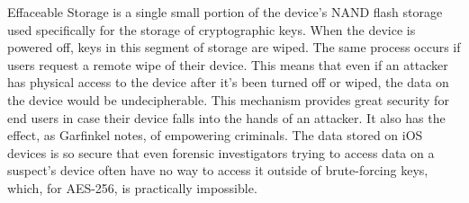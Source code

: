 Effaceable Storage is a single small portion of the device's NAND flash storage
used specifically for the storage of cryptographic keys. When the device is
powered off, keys in this segment of storage are wiped. The same process occurs
if users request a remote wipe of their device. This means that even if
an attacker has physical access to the device after it's been turned off or
wiped, the data on the device would be undecipherable\cite{garfinkel}. This
mechanism provides great security for end users in case their device falls into
the hands of an attacker. It also has the effect, as Garfinkel notes, of
empowering criminals. The data stored on iOS devices is so secure that even
forensic investigators trying to access data on a suspect's device often have
no way to access it outside of brute-forcing keys, which, for AES-256, is
practically impossible.
